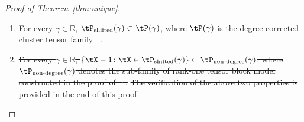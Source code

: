 \documentclass[lettersize,onecolumn,journal]{IEEEtran}
\theoremstyle{definition}
\theoremstyle{definition}
\providecommand{\DIFdeltex}[1]{{\protect\color{red}\sout{#1}}}                      %
\providecommand{\DIFdel}[1]{\texorpdfstring{\DIFdeltex{#1}}{}} %
\begin{document}
\begin{proof}[Proof of Theorem~\ref{thm:unique}]
\begin{enumerate}[wide]
\DIFdel{The idea of proving computational hardness is to show the computational lower bound for aspecial class of degree-corrected tensor clustering model with $K\geq 2$. We construct the following special class of higher-order degree-corrected tensor clustering  model. For a given signal level $\gamma\in\bbR$ and noise variance $\sigma$, define a rank-2 symmetric tensor $\tS\in\bbR^{3\times \cdots\times 3}$ subject to
}%
\DIFdel{Then, we consider the signal tensor family
}%
\DIFdel{We claim that the constructed family satisfies the following two properties:
}%
\item%
\DIFdel{For every $\gamma\in \mathbb{R}$, $\tP_{\text{shifted}}(\gamma)\subset \tP(\gamma)$, where $\tP(\gamma)$ is the degree-corrected cluster tensor family~}%
\DIFdel{.
    }%
\item%
\DIFdel{For every $\gamma\in \mathbb{R}$, $\{\tX-1\colon \tX\in \tP_{\text{shifted}}(\gamma)\}\subset \tP_{\text{non-degree}}(\gamma)$, where $\tP_{\text{non-degree}}(\gamma)$ denotes the sub-family of rank-one tensor block model constructed in the proof of \mbox{%
\citet[Theorem 7]{han2020exact}}\hspace{0pt}%
. 
}%
\DIFdel{The verification of the above two properties is provided in the end of this proof. 
}%


\end{enumerate}
\end{proof}
\end{document}
